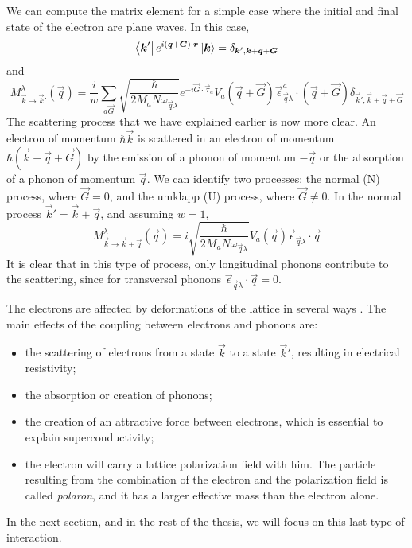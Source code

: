We can compute the matrix element for a simple case where the initial and final state of the electron are plane waves. In this case,
\begin{equation}
    \bra{\mathbf{\boldsymbol{k}}'} e^{i(\mathbf{\boldsymbol{q}} + \mathbf{\boldsymbol{G}})\cdot \mathbf{\boldsymbol{r}}} \ket{\mathbf{\boldsymbol{k}}} = \delta_{\mathbf{\boldsymbol{k}}', \mathbf{\boldsymbol{k}}+\mathbf{\boldsymbol{q}}+\mathbf{\boldsymbol{G}}}
\end{equation}
and
\begin{equation}
    M_{\vec{k} \rightarrow \vec{k}'}^\lambda(\vec{q}) =  \frac{i}{w} \sum_{a\vec{G}} \sqrt{\frac{\hbar}{2M_aN\omega_{\vec{q}\lambda}}}  e^{-i \vec{G} \cdot \vec{\tau}_a} V_a(\vec{q} + \vec{G}) \vec{\epsilon}_{\vec{q}\lambda}^a \cdot (\vec{q}+\vec{G}) \delta_{\vec{k}', \vec{k}+\vec{q}+\vec{G}}
\end{equation}
The scattering process that we have explained earlier is now more clear. An electron of momentum $\hbar\vec{k}$ is scattered in an electron of momentum $\hbar (\vec{k}+\vec{q}+\vec{G})$ by the emission of a phonon of momentum $-\vec{q}$ or the absorption of a phonon of momentum $\vec{q}$. We can identify two processes: the normal (N) process, where $\vec{G} = 0$, and the umklapp (U) process, where $\vec{G} \neq 0$. In the normal process $\vec{k}' = \vec{k} + \vec{q}$, and assuming $w=1$,
\begin{equation}
    M_{\vec{k} \rightarrow \vec{k} + \vec{q}}^\lambda(\vec{q}) =  i \sqrt{\frac{\hbar}{2M_aN\omega_{\vec{q}\lambda}}}   V_a(\vec{q}) \vec{\epsilon}_{\vec{q}\lambda} \cdot \vec{q}
\end{equation}
It is clear that in this type of process, only longitudinal phonons contribute to the scattering, since for transversal phonons $\vec{\epsilon}_{\vec{q}\lambda} \cdot \vec{q} = 0$.

The electrons are affected by deformations of the lattice in several ways \cite{kittel1987}. The main effects of the coupling between  electrons and phonons are:
\begin{itemize}
    \item the scattering of electrons from a state $\vec{k}$ to a state $\vec{k}'$, resulting in electrical resistivity;
    \item the absorption or creation of phonons;
    \item the creation of an attractive force between electrons, which is essential to explain superconductivity;
    \item the electron will carry a lattice polarization field with him. The particle resulting from the combination of the electron and the polarization field is called \emph{polaron}, and it has a larger effective mass than the electron alone.
\end{itemize}
In the next section, and in the rest of the thesis, we will focus on this last type of interaction.